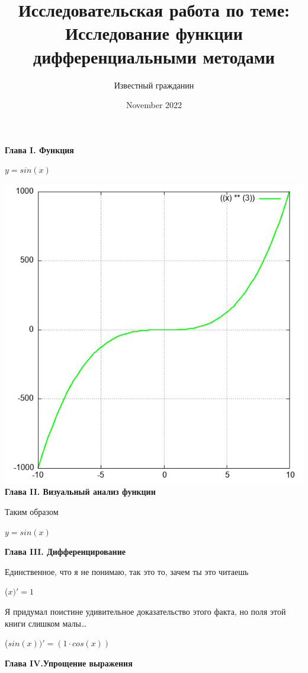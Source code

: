 \documentclass[12pt,a4paper,fleqn]{article}
\title{\textbf{\LARGE{Исследовательская работа по теме:\\Исследование функции дифференциальными методами}}}
\author{Известный гражданин}
\date{November 2022}
\begin{document}
\maketitle
\newpage\newpage \textbf{\LARGE{Глава I. Функция}}

\begin{center}
$y = $$sin(x)$

\end{center}
\includegraphics{GraphicDumps/plot.jpg}\newpage \textbf{\LARGE{Глава II. Визуальный анализ функции}}

Таким образом

\begin{center}
$y = $$sin(x)$

\end{center}
\newpage \textbf{\LARGE{Глава III. Дифференцирование}}

Единственное, что я не понимаю, так это то, зачем ты это читаешь

\begin{center}
 ($x)'
  = 1$\end{center}
Я придумал поистине удивительное доказательство этого факта, но поля этой книги слишком малы\ldots

\begin{center}
 ($sin(x))'
  = (1 \cdot cos(x))$\end{center}
\newpage \textbf{\LARGE{Глава IV.Упрощение выражения}}
\end{document}
